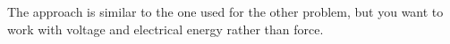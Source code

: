 The approach is similar to the one used for the other problem, but you
want to work with voltage and electrical energy rather than force. 

